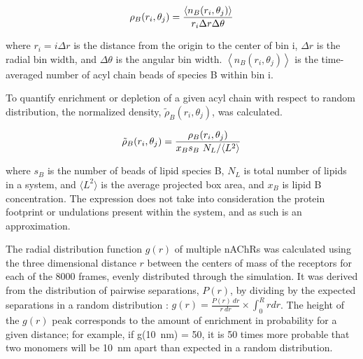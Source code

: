   \begin{equation}
      \rho_{B}(r_i,\theta_j)= \frac{\left\langle n_{B}(r_i,\theta_j) \right\rangle}{r_i \Delta{r}\Delta{\theta}} \\        
    \label{eq:R}
  \end{equation}

where $r_i = i \Delta r$ is the distance from the origin to the center of bin i, $\Delta r$ is the radial bin width, and $\Delta \theta$ is the angular bin width. $\left\langle n_{B}(r_i,\theta_j) \right\rangle$ is the time-averaged number of acyl chain beads of species B within bin i.

To quantify enrichment or depletion of a given acyl chain with respect to random distribution, the normalized density, $ \tilde{\rho}_{B}(r_i,\theta_j)$, was calculated.

  \begin{equation}
  \tilde{\rho}_{B}(r_i,\theta_j)=\frac{ \rho_{B}(r_i,\theta_j)}{x_{B}s_{B}~N_{L}/\langle L^{2}\rangle} \\        
    \label{eq:Rt}
  \end{equation}
  
  where $s_B$ is the number of beads of lipid species B, $N_L$ is total number of lipids in a system, and $\langle L^{2}\rangle$ is the average projected box area, and $x_B$ is lipid B concentration. The expression does not take into consideration the protein footprint or undulations present within the system, and as such is an approximation.





The radial distribution function $g(r)$ of multiple nAChRs was calculated using the three dimensional distance $r$ between the centers of mass of the receptors for each of the 8000 frames, evenly distributed through the simulation. %
It was derived from the distribution of pairwise separations, $P(r)$, by dividing by the expected separations in a random distribution : $g(r) = \frac{P(r)~dr}{r~dr}\times\int_{0}^{R} r dr$.  
The height of the $g(r)$ peak corresponds to the amount of enrichment in probability for a given distance; for example, if g(10~nm) = 50, it is 50 times more probable that two monomers will be 10~nm apart than expected in a random distribution.

